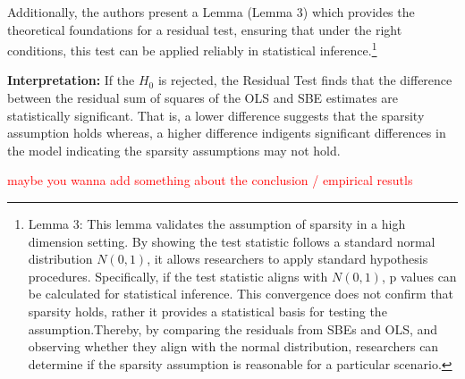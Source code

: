 \begin{enumerate}
    Additionally, the authors present a Lemma (Lemma 3) which provides the theoretical foundations for a residual test, ensuring that under the right conditions, this test can be applied reliably in statistical inference.\footnote{Lemma 3: This lemma validates the assumption of sparsity in a high dimension setting. By showing the test statistic follows a standard normal distribution $N(0,1)$, it allows researchers to apply standard hypothesis procedures. Specifically, if the test statistic aligns with $N(0,1)$, p values can be calculated for statistical inference. This convergence does not confirm that sparsity holds, rather it provides a statistical basis for testing the assumption.Thereby, by comparing the residuals from SBEs and OLS, and observing whether they align with the normal distribution, researchers can determine if the sparsity assumption is reasonable for a particular scenario.}
\end{enumerate}

\textbf{Interpretation:} If the $H_0$ is rejected, the Residual Test finds that the difference between the residual sum of squares of the OLS and SBE estimates are statistically significant. That is, a lower difference suggests that the sparsity assumption holds whereas, a higher difference indigents significant differences in the model indicating the sparsity assumptions may not hold. 

\textcolor{red}{maybe you wanna add something about the conclusion / empirical resutls}
